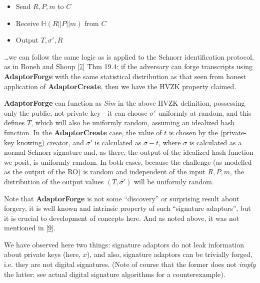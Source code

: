 \documentclass[10pt,a4paper]{article}
\begin{document}
\begin{itemize}
\item Send $R, P, m$ to $C$
\item Receive $\mathbb{H}(R||P||m)$ from $C$
\item Output $T, \sigma', R$
\end{itemize}

\ldots we can follow the same logic as is applied to the Schnorr identification protocol, as in Boneh and Shoup {[}\protect\hyperlink{anchor-7}{7}{]} Thm 19.4: if the adversary can forge transcripts using \textbf{AdaptorForge} with the same statistical distribution as that seen from honest application of \textbf{AdaptorCreate}, then we have the HVZK property claimed.

\vspace{5 pt}

\textbf{AdaptorForge} can function as \emph{Sim} in the above HVZK definition, possessing only the public, not private key - it can choose $\sigma'$ uniformly at random, and this defines $T$, which will also be uniformly random, assuming an idealized hash function. In the \textbf{AdaptorCreate} case, the value of $t$ is chosen by the (private-key knowing) creator, and $\sigma'$ is calculated as $\sigma - t$, where $\sigma$ is calculated as a normal Schnorr signature and, as there, the output of the idealized hash function we posit, is uniformly random. In both cases, because the challenge (as modelled as the output of the RO) is random and independent of the input $R, P, m$, the distribution of the output values $(T, \sigma')$ will be uniformly random.

\vspace{5 pt}

Note that \textbf{AdaptorForge} is not some ``discovery'' or surprising result about forgery, it is well known and intrinsic property of such ``signature adaptors'', but it is crucial to development of concepts here. And as noted above, it was not mentioned in {[}\protect\hyperlink{anchor-9}{9}{]}.

\vspace{5 pt}

We have observed here two things: signature adaptors do not leak information about private keys (here, $x$), and also, signature adaptors can be trivially forged, i.e. they are not digital signatures. (Note of course that the former does not \emph{imply} the latter; see actual digital signature algorithms for a counterexample).

\vspace{5 pt}
\end{document}
